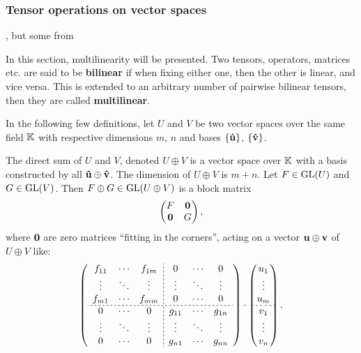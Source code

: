 \subsubsection{Tensor operations on vector spaces}

	\cite{Jeevanjee}, but some from \cite{holst}
	
	In this section, multilinearity will be presented. Two tensors, operators, matrices etc. are said to be \textbf{bilinear} if when fixing either one, then the other is linear, and vice versa. This is extended to an arbitrary number of pairwise bilinear tensors, then they are called \textbf{multilinear}.
	
	In the following few definitions, let $U$ and $V$ be two vector spaces over the same field $\mathbb{K}$ with respective dimensions $m$, $n$ and bases $\{\mathbf{\hat{u}}\}$, $\{\mathbf{\hat{v}}\}$.
	
	\begin{definition}
		The direct sum of $U$ and $V$, denoted $U \oplus V$ is a vector space over $\mathbb{K}$ with a basis constructed by all $\mathbf{\hat{u}} \oplus \mathbf{\hat{v}}$. The dimension of $U \oplus V$ is $m+n$. Let $F \in \text{GL}(U)$ and $G \in \text{GL}(V)$. Then $F \oplus G \in \text{GL}(U \oplus V)$ is a block matrix
		\begin{align}
			\begin{pmatrix}
				F & \mathbf{0} \\
				\mathbf{0} & G
			\end{pmatrix},
		\end{align}
		where $\mathbf{0}$ are zero matrices ``fitting in the corners'', acting on a vector $\mathbf{u} \oplus \mathbf{v}$ of $U \oplus V$ like:
		\begin{align}
			\left(
			\begin{array}{ccc;{2pt/2pt}ccc}
				f_{11}                    & \cdots & f_{1m} & 0      & \cdots & 0      \\
				\vdots                    & \ddots & \vdots & \vdots & \ddots & \vdots \\
				f_{m1}                    & \cdots & f_{mm} & 0      & \cdots & 0      \\
				\hdashline[2pt/2pt]
				0 & \cdots & 0      & g_{11} & \cdots & g_{1n} \\
				\vdots                    & \ddots & \vdots & \vdots & \ddots & \vdots \\
				0                         & \cdots & 0      & g_{n1} & \cdots & g_{nn}
			\end{array}
			\right)\cdot
			\begin{pmatrix}
				u_1                         \\
				\vdots                          \\
				u_{m}                       \\
				\hdashline[2pt/2pt]
				v_1 \\
				\vdots                          \\
				v_{n}
			\end{pmatrix}.
		\end{align}
	\end{definition}
	
